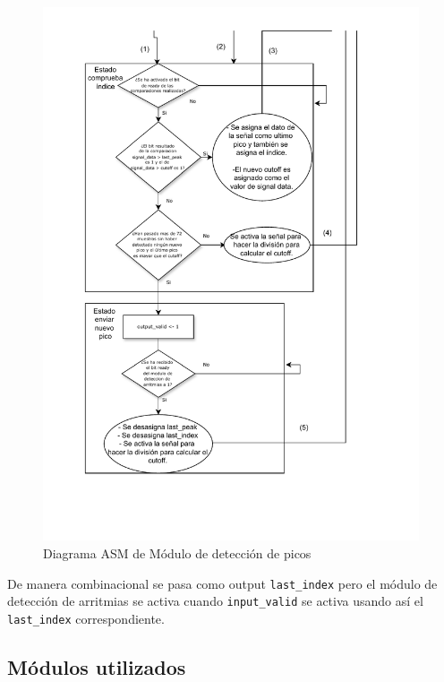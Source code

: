 \begin{figure}[h!]
    \centering
    \includegraphics[width=0.99\textwidth]{./Images/img_implementacion_hw/Diagramaasmpicos2.pdf}
    \caption{Diagrama ASM de Módulo de detección de picos}
    \label{fig:Diagramaasmpicos2}
\end{figure} 
\FloatBarrier
De manera combinacional se pasa como output \texttt{last\_index} pero el módulo de detección de arritmias se activa cuando \texttt{input\_valid}
se activa usando así el \texttt{last\_index} correspondiente.

\subsection{Módulos utilizados}

